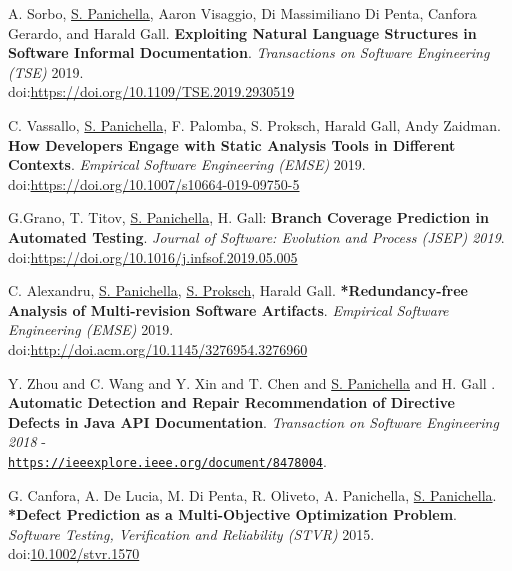 \documentclass[10pt]{article}
\newcommand\doilink[1]{\href{http://dx.doi.org/#1}{#1}}
\newcommand\doi[1]{doi:\doilink{#1}}
\providecommand*\url[1]{\href{#1}{#1}}
\renewcommand*\url[1]{\href{#1}{\texttt{#1}}}
\begin{document}
\begin{bibenum}
\item \label{J04} A. Sorbo, \underline{S. Panichella},  Aaron Visaggio, Di Massimiliano Di Penta, Canfora Gerardo, and Harald Gall. \textbf{Exploiting Natural Language Structures in Software Informal Documentation}. \emph{Transactions on Software Engineering (TSE)} 2019. \\ \doi{https://doi.org/10.1109/TSE.2019.2930519}\\
\item \label{J03} C. Vassallo, \underline{S. Panichella}, F. Palomba, S. Proksch, Harald Gall, Andy Zaidman. \textbf{How Developers Engage with Static Analysis Tools in Different Contexts}. \emph{Empirical Software Engineering (EMSE)} 2019.\\ \doi{https://doi.org/10.1007/s10664-019-09750-5}\\
    
\item \label{J02} G.Grano, T. Titov, \underline{S. Panichella}, H. Gall: \textbf{Branch Coverage Prediction in Automated Testing}.  \emph{Journal of Software: Evolution and Process (JSEP) 2019}. \\ \doi{https://doi.org/10.1016/j.infsof.2019.05.005}\\

\item \label{J0} C. Alexandru,  \underline{S. Panichella}, \underline{S. Proksch}, Harald Gall. \textbf{*Redundancy-free Analysis of Multi-revision Software Artifacts}. \emph{Empirical Software Engineering (EMSE)} 2019.\\
    \doi{http://doi.acm.org/10.1145/3276954.3276960}\\
      \item \label{J01}  Y. Zhou and 
   C. Wang and Y. Xin and T. Chen and \underline{S. Panichella} and H. Gall . \textbf{Automatic Detection and Repair Recommendation of Directive Defects in Java API Documentation}.  \emph{Transaction on Software Engineering 2018} - \\\url{https://ieeexplore.ieee.org/document/8478004}.

\item \label{J1} G. Canfora, A. De Lucia, M. Di Penta, R. Oliveto, A. Panichella, \underline{S. Panichella}. \textbf{*Defect Prediction as a Multi-Objective Optimization Problem}. \emph{Software Testing, Verification and Reliability (STVR)} 2015.\\
    \doi{10.1002/stvr.1570}\\
  \end{bibenum}
  
\end{document}
